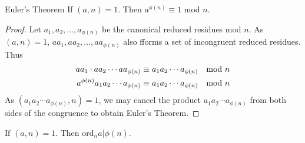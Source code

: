 
\begin{mysubsection}{}
    \begin{theorem}[thm:]{Euler's Theorem}
        If $(a,n)=1$. Then $a^{\phi(n)}\equiv 1$ mod $n$.
    \end{theorem}

    \begin{proof}
        Let $a_1,a_2,\dots,a_{\phi (n)}$ be the canonical reduced residues mod $n$. As $(a,n)=1$, $aa_1,aa_2,\dots,aa_{\phi (n)}$ also fforms a set of incongruent reduced residues. Thus
        \begin{alignat*}{1}
            aa_1\cdot aa_2\cdots aa_{\phi (n)}&\equiv a_1a_2\cdots a_{\phi (n)}\quad \textnormal{mod }n\\
            a^{\phi (n)}a_1a_2\cdots a_{\phi (n)}&\equiv a_1a_2\cdots a_{\phi (n)}\quad \textnormal{mod }n
        \end{alignat*}
        As $(a_1a_2\cdots a_{\phi (n)},n)=1$, we may cancel the product $a_1a_2\cdots a_{\phi (n)}$ from both sides of the congruence to obtain Euler's Theorem.
    \end{proof}

    \begin{corollary}[crl:]{}
        If $(a,n)=1$. Then ord$_na|\phi (n)$.
    \end{corollary}
\end{mysubsection}

\begin{shortque}[]{}


\end{shortque}
